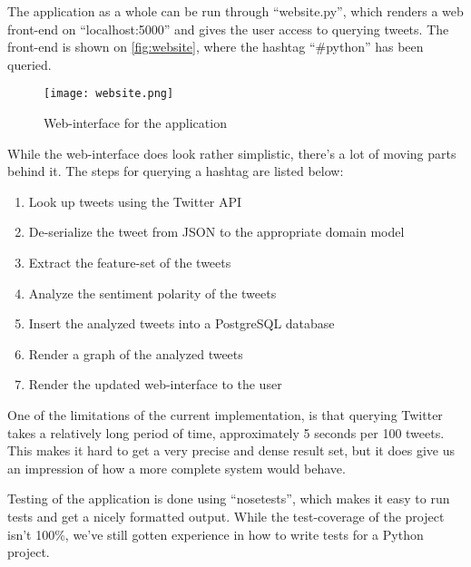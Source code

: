 \documentclass[Main]{subfiles}
\begin{document}
The application as a whole can be run through ``website.py'', 
which renders a web front-end on ``localhost:5000'' and gives the user access to querying tweets.
The front-end is shown on \autoref{fig:website}, where the hashtag ``\#python'' has been queried.

\begin{figure}[h]
  \centering
  \texttt{[image: website.png]}
  \caption{Web-interface for the application}
  \label{fig:website}
\end{figure}

While the web-interface does look rather simplistic, there's a lot of moving parts behind it.
The steps for querying a hashtag are listed below:
\begin{enumerate}
\item Look up tweets using the Twitter API
\item De-serialize the tweet from JSON to the appropriate domain model
\item Extract the feature-set of the tweets
\item Analyze the sentiment polarity of the tweets
\item Insert the analyzed tweets into a PostgreSQL database
\item Render a graph of the analyzed tweets
\item Render the updated web-interface to the user
\end{enumerate}

One of the limitations of the current implementation, is that querying Twitter takes a relatively long period of time,
approximately 5 seconds per 100 tweets.
This makes it hard to get a very precise and dense result set, but it does give us an impression of how a more complete system would behave.

Testing of the application is done using ``nosetests'', which makes it easy to run tests and get a nicely formatted output.
While the test-coverage of the project isn't 100\%, we've still gotten experience in how to write tests for a Python project.
\end{document}
